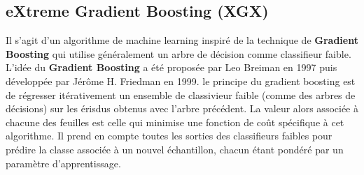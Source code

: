 \documentclass[
]{article}
\newenvironment{Shaded}{\begin{snugshade}}{\end{snugshade}}
\newcommand{\AttributeTok}[1]{\textcolor[rgb]{0.77,0.63,0.00}{#1}}
\newcommand{\CommentTok}[1]{\textcolor[rgb]{0.56,0.35,0.01}{\textit{#1}}}
\newcommand{\ConstantTok}[1]{\textcolor[rgb]{0.00,0.00,0.00}{#1}}
\newcommand{\ControlFlowTok}[1]{\textcolor[rgb]{0.13,0.29,0.53}{\textbf{#1}}}
\newcommand{\DecValTok}[1]{\textcolor[rgb]{0.00,0.00,0.81}{#1}}
\newcommand{\DocumentationTok}[1]{\textcolor[rgb]{0.56,0.35,0.01}{\textbf{\textit{#1}}}}
\newcommand{\FunctionTok}[1]{\textcolor[rgb]{0.00,0.00,0.00}{#1}}
\newcommand{\NormalTok}[1]{#1}
\newcommand{\OtherTok}[1]{\textcolor[rgb]{0.56,0.35,0.01}{#1}}
\newcommand{\SpecialCharTok}[1]{\textcolor[rgb]{0.00,0.00,0.00}{#1}}
\newcommand{\StringTok}[1]{\textcolor[rgb]{0.31,0.60,0.02}{#1}}
\begin{document}
\begin{Shaded}
\end{Shaded}

\hypertarget{extreme-gradient-boosting-xgx}{%
\subsection{eXtreme Gradient Boosting
(XGX)}\label{extreme-gradient-boosting-xgx}}

Il s'agit d'un algorithme de machine learning inspiré de la technique de
\textbf{Gradient Boosting} qui utilise généralement un arbre de décision
comme classifieur faible. L'idée du \textbf{Gradient Boosting} a été
proposée par Leo Breiman en 1997 puis développée par Jérôme H. Friedman
en 1999. le principe du gradient boosting est de régresser itérativement
un ensemble de classivieur faible (comme des arbres de décisions) sur
les érisdus obtenus avec l'arbre précédent. La valeur alors associée à
chacune des feuilles est celle qui minimise une fonction de coût
spécifique à cet algorithme. Il prend en compte toutes les sorties des
classifieurs faibles pour prédire la classe associée à un nouvel
échantillon, chacun étant pondéré par un paramètre d'apprentissage.
\end{document}
